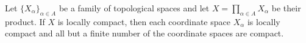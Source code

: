 Let $\{X_\alpha\}_{\alpha \in A}$ be a family of topological spaces and let $X = \prod_{\alpha \in A} X_\alpha$ be their product. If $X$ is locally compact, then each coordinate space $X_\alpha$ is locally compact and all but a finite number of the coordinate spaces are compact.
